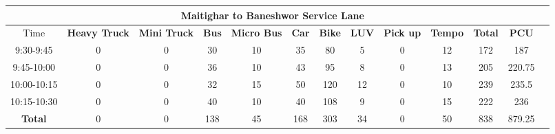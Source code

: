 \begin{landscape}
\begin{table}[h!]
\vspace{0.5cm}

\begin{tabular}{|c|c|c|c|c|c|c|c|c|c|c|c|c|}
    \hline
    \multicolumn{12}{|c|}{\textbf{Maitighar to Baneshwor Service Lane}} \\
    \hline
        Time & \textbf{Heavy Truck} & \textbf{Mini Truck} & \textbf{Bus} & \textbf{Micro Bus} & \textbf{Car} & \textbf{Bike} & \textbf{LUV} & \textbf{Pick up} & \textbf{Tempo} & \textbf{\textbf{Total}} & \textbf{PCU} \\
    \hline
9:30-9:45	&0	&0	&30	&10	&35	&80	&5	&0	&12	&172	&187 \\ \hline
9:45-10:00	&0	&0	&36	&10	&43	&95	&8	&0	&13	&205	&220.75 \\ \hline
10:00-10:15	&0	&0	&32	&15	&50	&120	&12	&0	&10	&239	&235.5 \\ \hline
10:15-10:30	&0	&0	&40	&10	&40	&108	&9	&0	&15	&222	&236 \\ \hline
\textbf{Total}	&0	&0	&138	&45	&168	&303	&34	&0	&50	&838	&879.25 \\ \hline



\end{tabular}

\end{table}
\end{landscape}


